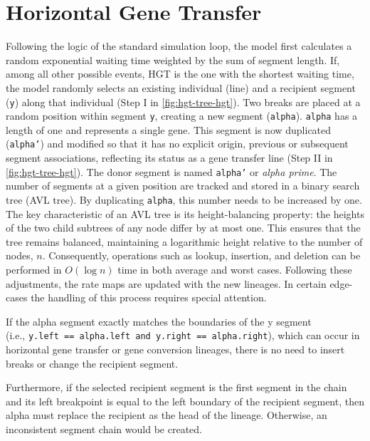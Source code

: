 \section{Horizontal Gene Transfer}
Following the logic of the standard simulation loop, the model first calculates a random exponential waiting time weighted by the sum of segment length.
If, among all other possible events, \ac{HGT} is the one with the shortest waiting time,
the model randomly selects an existing individual (line) and a recipient segment (\texttt{y}) along that individual (Step I in \ref{fig:hgt-tree-hgt}).
Two breaks are placed at a random position within segment \texttt{y}, creating a new segment (\texttt{alpha}).
\texttt{alpha} has a length of one and represents a single gene.
This segment is now duplicated (\texttt{alpha'}) and modified so that it has no explicit origin, previous or subsequent segment associations, reflecting its status as a gene transfer line (Step II  in \ref{fig:hgt-tree-hgt}).
The donor segment is named \texttt{alpha'} or \textit{alpha prime}.
The number of segments at a given position are tracked and stored in a binary search tree (AVL tree).
By duplicating \texttt{alpha}, this number needs to be increased by one.
The key characteristic of an AVL tree is its height-balancing property: the heights of the two child subtrees of any node differ by at most one.
This ensures that the tree remains balanced, maintaining a logarithmic height relative to the number of nodes, $n$.
Consequently, operations such as lookup, insertion, and deletion can be performed in $O(\log n)$ time in both average and worst cases.
Following these adjustments, the rate maps are updated with the new lineages.
In certain edge-cases the handling of this process requires special attention.

If the alpha segment exactly matches the boundaries of the y segment\\
(i.e., \texttt{y.left == alpha.left and y.right == alpha.right}),
which can occur in horizontal gene transfer or gene conversion lineages, there is no need to insert breaks or change the recipient segment.

Furthermore, if the selected recipient segment is the first segment in the chain and its left breakpoint is equal to the left boundary of the recipient segment, then alpha must replace the recipient as the head of the lineage.
Otherwise, an inconsistent segment chain would be created.

